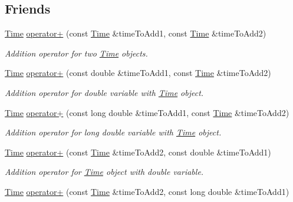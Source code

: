 \subsection*{Friends}
\begin{DoxyCompactItemize}
\item 
\hyperlink{classtudat_1_1Time}{Time} \hyperlink{classtudat_1_1Time_ada13ce81f50cca6a7929ecf1e2715111}{operator+} (const \hyperlink{classtudat_1_1Time}{Time} \&time\+To\+Add1, const \hyperlink{classtudat_1_1Time}{Time} \&time\+To\+Add2)
\begin{DoxyCompactList}\small\item\em Addition operator for two \hyperlink{classtudat_1_1Time}{Time} objects. \end{DoxyCompactList}\item 
\hyperlink{classtudat_1_1Time}{Time} \hyperlink{classtudat_1_1Time_a5e9c7ddec18a8c5e909d721386500a35}{operator+} (const double \&time\+To\+Add1, const \hyperlink{classtudat_1_1Time}{Time} \&time\+To\+Add2)
\begin{DoxyCompactList}\small\item\em Addition operator for double variable with \hyperlink{classtudat_1_1Time}{Time} object. \end{DoxyCompactList}\item 
\hyperlink{classtudat_1_1Time}{Time} \hyperlink{classtudat_1_1Time_a81a49cc250f5d46d8fc652bcb3aa4c89}{operator+} (const long double \&time\+To\+Add1, const \hyperlink{classtudat_1_1Time}{Time} \&time\+To\+Add2)
\begin{DoxyCompactList}\small\item\em Addition operator for long double variable with \hyperlink{classtudat_1_1Time}{Time} object. \end{DoxyCompactList}\item 
\hyperlink{classtudat_1_1Time}{Time} \hyperlink{classtudat_1_1Time_a139ddbc5e3b4b93a368c404509334feb}{operator+} (const \hyperlink{classtudat_1_1Time}{Time} \&time\+To\+Add2, const double \&time\+To\+Add1)
\begin{DoxyCompactList}\small\item\em Addition operator for \hyperlink{classtudat_1_1Time}{Time} object with double variable. \end{DoxyCompactList}\item 
\hyperlink{classtudat_1_1Time}{Time} \hyperlink{classtudat_1_1Time_ad6c6756b57a40443dce02fad7d3e3813}{operator+} (const \hyperlink{classtudat_1_1Time}{Time} \&time\+To\+Add2, const long double \&time\+To\+Add1)

\end{DoxyCompactItemize}
